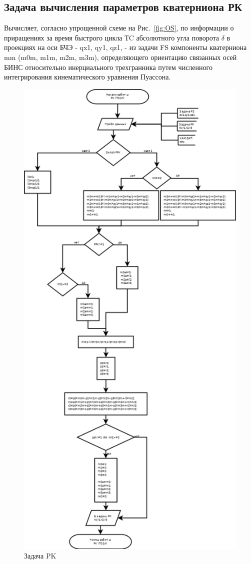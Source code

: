 \subsection{Задача вычисления параметров кватерниона РК}
Вычисляет, согласно упрощенной схеме на Рис.~\ref{fig:OS},  по  информации о приращениях за время быстрого цикла ТC  абсолютного угла поворота $\delta$ в проекциях на оси БЧЭ -  qx1, qy1, qz1, - из задачи  FS 
компоненты кватерниона mm (m0m, m1m, m2m, m3m), определяющего  ориентацию связанных осей БИНС относительно инерциального трехгранника путем численного 
интегрирования кинематического уравнения Пуассона.
\begin{figure}[H]
    \centering
    \includegraphics[width=0.7\linewidth]{images/PK.png}
    \caption{Задача PK}
    \label{fig:PK}
\end{figure}

